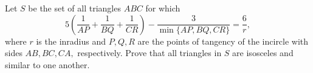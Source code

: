 Let $S$ be the set of all triangles $ABC$ for which \[ 5 \left( \dfrac{1}{AP} + \dfrac{1}{BQ} + \dfrac{1}{CR} \right) - \dfrac{3}{\min\{ AP, BQ, CR \}} = \dfrac{6}{r},  \] where $r$ is the inradius and $P, Q, R$ are the points of tangency of the incircle with sides $AB, BC, CA,$ respectively. Prove that all triangles in $S$ are isosceles  and similar to one another.